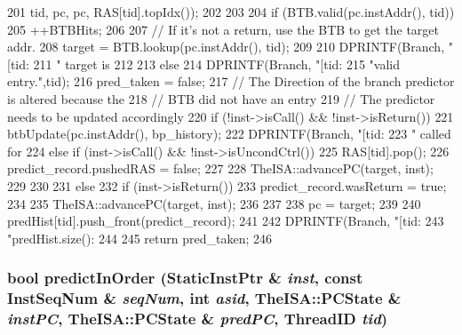 \begin{DoxyCode}
{{{{201                         tid, pc, pc, RAS[tid].topIdx());
202             }
203 
204             if (BTB.valid(pc.instAddr(), tid)) {
205                 ++BTBHits;
206 
207                 // If it's not a return, use the BTB to get the target addr.
208                 target = BTB.lookup(pc.instAddr(), tid);
209 
210                 DPRINTF(Branch, "[tid:%
211                         " target is %
212 
213             } else {
214                 DPRINTF(Branch, "[tid:%
215                         "valid entry.\n",tid);
216                 pred_taken = false;
217                 // The Direction of the branch predictor is altered because the
218                 // BTB did not have an entry
219                 // The predictor needs to be updated accordingly
220                 if (!inst->isCall() && !inst->isReturn()) {
221                       btbUpdate(pc.instAddr(), bp_history);
222                       DPRINTF(Branch, "[tid:%
223                               " called for %
224                 } else if (inst->isCall() && !inst->isUncondCtrl()) {
225                       RAS[tid].pop();
226                       predict_record.pushedRAS = false;
227                 }
228                 TheISA::advancePC(target, inst);
229             }
230         }
231     } else {
232         if (inst->isReturn()) {
233            predict_record.wasReturn = true;
234         }
235         TheISA::advancePC(target, inst);
236     }
237 
238     pc = target;
239 
240     predHist[tid].push_front(predict_record);
241 
242     DPRINTF(Branch, "[tid:%
243             "predHist.size(): %
244 
245     return pred_taken;
246 }
\end{DoxyCode}
\hypertarget{classBPredUnit_a73a7edc2571c70838069e32ff33a2788}{
\subsubsection[{predictInOrder}]{\setlength{\rightskip}{0pt plus 5cm}bool predictInOrder ({\bf StaticInstPtr} \& {\em inst}, \/  const {\bf InstSeqNum} \& {\em seqNum}, \/  int {\em asid}, \/  TheISA::PCState \& {\em instPC}, \/  TheISA::PCState \& {\em predPC}, \/  {\bf ThreadID} {\em tid})}}
\label{classBPredUnit_a73a7edc2571c70838069e32ff33a2788}



